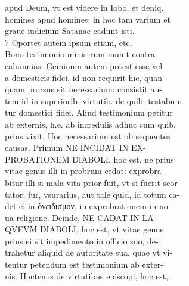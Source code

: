 \documentclass{article}
\begin{document}
\begin{pages}
                apud Deum, vt est videre in Iobo, et deniq. \\
                homines apud homines: in hoc tam varium et \\
                graue iudicium Satanae cadunt isti. \\
                7 Oportet autem ipsum etiam, etc. \\
                Bono testimonio ministrum munit contra \\
                calumnias. Geminum autem potest esse vel \\
                a domesticis fidei, id non requirit hic, quan- \\
                quam prorsus sit necessarium: consistit au- \\
                tem id in superiorib. virtutib. de quib. testabum- \\
                tur domestici fidei. Aliud testimonium petitur \\
                ab externis, h.e. ab incredulis adhuc cum quib. \\
                prius vixit. Hoc necessarium est ob sequentes \\
                causas. Primum NE INCIDAT IN EX- \\
                PROBATIONEM DIABOLI, hoc est, ne prius \\
                vitae genus illi in probrum cedat: exprobra- \\
                bitur illi si mala vita prior fuit, vt si fuerit scor \\
                tator, fur, vsurarius, aut tale quid, id totum ca- \\
                det ei in ὀνειδισμόν, in exprobrationem in no- \\
                ua religione. Deinde, NE CADAT IN LA- \\
                QVEVM DIABOLI, hoc est, vt vitae genus \\
                prius ei sit impedimento in officio suo, de- \\
                trahetur aliquid de autoritate sua, quae vt vi- \\
                tentur petendum est testimonium ab exter- \\
                nis. Hactenus de virtutibus episcopi, hoc est, \\

\end{pages}
\end{document}
